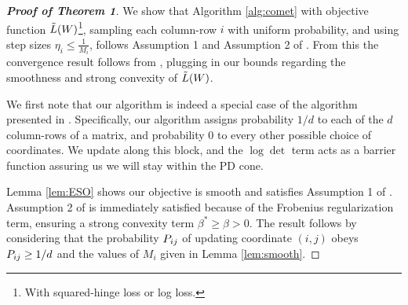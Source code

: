 \documentclass{article}
\begin{document}
\begin{proof}[\bf{Proof of Theorem 1}]
We show that Algorithm \ref{alg:comet} with objective function $\tilde{L}({W})$\footnote{With squared-hinge loss or log loss.}, sampling each column-row $i$ with uniform probability, and using step sizes $\eta_i \leq \frac{1}{M_i}$, follows Assumption 1 and Assumption 2 of \citet{richtarik2013optimal}. From this the convergence result follows from \citeauthor[Theorem 3]{richtarik2013optimal}, plugging in our bounds regarding the smoothness and strong convexity of $\tilde{L}({W})$.

We first note that our algorithm is indeed a special case of the algorithm presented in \citet{richtarik2013optimal}. Specifically, our algorithm assigns probability $1/d$ to each of the $d$ column-rows of a matrix, and probability $0$ to every other possible choice of coordinates. We update along this block, and the $\log \det$ term acts as a barrier function
assuring us we will stay within the PD cone.

Lemma \ref{lem:ESO} shows our objective is smooth and satisfies Assumption 1 of \citeauthor{richtarik2013optimal}. Assumption 2 of \citeauthor{richtarik2013optimal} is immediately satisfied because of the Frobenius regularization term, ensuring a strong convexity term  $\beta^* \geq \beta > 0$. The result follows by considering that the probability ${P}_{ij}$ of updating coordinate $(i,j)$ obeys ${P}_{ij} \geq 1/d$ and the values of $M_i$ given in Lemma \ref{lem:smooth}.

\end{proof}



\end{document}
